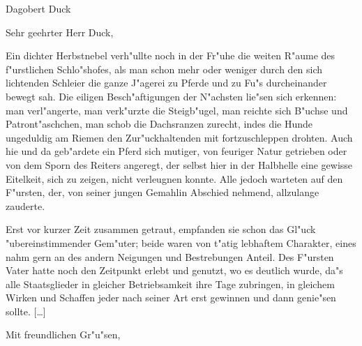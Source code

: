 \documentclass{tudhaus}
\begin{document}




\subject{Novelle}

\begin{letter}{Dagobert Duck}
  \opening{Sehr geehrter Herr Duck,}
    Ein dichter Herbstnebel verh"ullte noch in der Fr"uhe die weiten R"aume des
    f"urstlichen Schlo"shofes, als man schon mehr oder weniger durch den sich
    lichtenden Schleier die ganze J"agerei zu Pferde und zu Fu"s durcheinander
    bewegt sah. Die eiligen Besch"aftigungen der N"achsten lie"sen sich 
    erkennen:
    man verl"angerte, man verk"urzte die Steigb"ugel, man reichte sich B"uchse
    und Patront"aschchen, man schob die Dachsranzen zurecht, indes die Hunde
    ungeduldig am Riemen den Zur"uckhaltenden mit fortzuschleppen drohten. Auch
    hie und da geb"ardete ein Pferd sich mutiger, von feuriger Natur getrieben
    oder von dem Sporn des Reiters angeregt, der selbst hier in der Halbhelle
    eine gewisse Eitelkeit, sich zu zeigen, nicht verleugnen konnte. Alle jedoch
    warteten auf den F"ursten, der, von seiner jungen Gemahlin Abschied nehmend,
    allzulange zauderte.
    
    Erst vor kurzer Zeit zusammen getraut, empfanden sie schon das Gl"uck
    "ubereinstimmender Gem"uter; beide waren von t"atig lebhaftem Charakter, 
    eines
    nahm gern an des andern Neigungen und Bestrebungen Anteil. Des F"ursten 
    Vater
    hatte noch den Zeitpunkt erlebt und genutzt, wo es deutlich wurde, da"s alle
    Staatsglieder in gleicher Betriebsamkeit ihre Tage zubringen, in gleichem
    Wirken und Schaffen jeder nach seiner Art erst gewinnen und dann genie"sen 
    sollte.
    [\ldots]
  \closing{Mit freundlichen Gr"u"sen,}
\end{letter}
\end{document}
